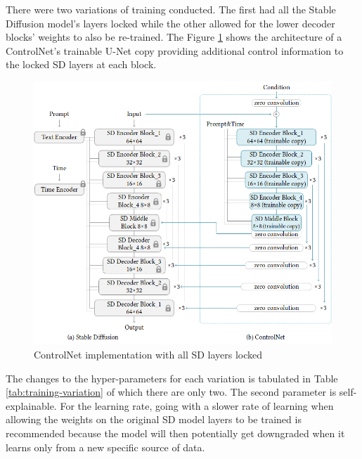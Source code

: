 There were two variations of training conducted. The first had all the Stable Diffusion model's layers locked while the other allowed for the lower decoder blocks' weights to also be re-trained. The Figure \ref{fig:controlnet-sd-locked} 
shows the architecture of a ControlNet's trainable U-Net copy providing additional control information to the locked SD layers at each block. 
\begin{figure}[ht]
    \centering
    \includegraphics[width=1\linewidth]{4_ResearchMethodology/figures/training_sd_locked.png}
    \caption[ControlNet architecture]{ControlNet implementation with all SD layers locked \parencite[Figure 3, p. 4 ]{Zhang2023AddingModels}}
    \label{fig:controlnet-sd-locked}
\end{figure}
The changes to the hyper-parameters for each variation is tabulated in Table \ref{tab:training-variation} of which there are only two. The second parameter is self-explainable. For the learning rate, going with a slower rate of learning when allowing the weights on the original SD model layers to be trained is recommended because the model will then potentially get downgraded when it learns only from a new specific source of data.

